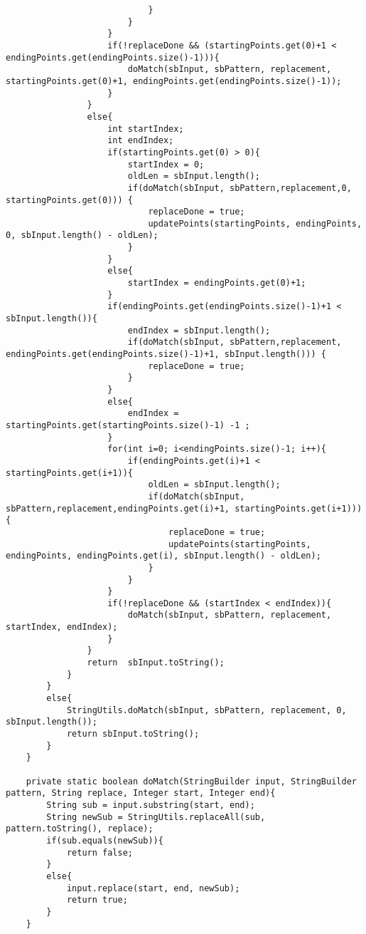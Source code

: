 \documentclass{article}
\begin{document}
\begin{lstlisting}
                            }
                        }
                    }
                    if(!replaceDone && (startingPoints.get(0)+1 < endingPoints.get(endingPoints.size()-1))){
                        doMatch(sbInput, sbPattern, replacement, startingPoints.get(0)+1, endingPoints.get(endingPoints.size()-1));
                    }
                }
                else{
                    int startIndex;
                    int endIndex;
                    if(startingPoints.get(0) > 0){
                        startIndex = 0;
                        oldLen = sbInput.length();
                        if(doMatch(sbInput, sbPattern,replacement,0, startingPoints.get(0))) {
                            replaceDone = true;
                            updatePoints(startingPoints, endingPoints, 0, sbInput.length() - oldLen);
                        }
                    }
                    else{
                        startIndex = endingPoints.get(0)+1;
                    }
                    if(endingPoints.get(endingPoints.size()-1)+1 < sbInput.length()){
                        endIndex = sbInput.length();
                        if(doMatch(sbInput, sbPattern,replacement, endingPoints.get(endingPoints.size()-1)+1, sbInput.length())) {
                            replaceDone = true;
                        }
                    }
                    else{
                        endIndex = startingPoints.get(startingPoints.size()-1) -1 ;
                    }
                    for(int i=0; i<endingPoints.size()-1; i++){
                        if(endingPoints.get(i)+1 < startingPoints.get(i+1)){
                            oldLen = sbInput.length();
                            if(doMatch(sbInput, sbPattern,replacement,endingPoints.get(i)+1, startingPoints.get(i+1))){
                                replaceDone = true;
                                updatePoints(startingPoints, endingPoints, endingPoints.get(i), sbInput.length() - oldLen);
                            }
                        }
                    }
                    if(!replaceDone && (startIndex < endIndex)){
                        doMatch(sbInput, sbPattern, replacement, startIndex, endIndex);
                    }
                }
                return  sbInput.toString();
            }
        }
        else{
            StringUtils.doMatch(sbInput, sbPattern, replacement, 0, sbInput.length());
            return sbInput.toString();
        }
    }

    private static boolean doMatch(StringBuilder input, StringBuilder pattern, String replace, Integer start, Integer end){
        String sub = input.substring(start, end);
        String newSub = StringUtils.replaceAll(sub, pattern.toString(), replace);
        if(sub.equals(newSub)){
            return false;
        }
        else{
            input.replace(start, end, newSub);
            return true;
        }
    }


\end{lstlisting}
\end{document}
